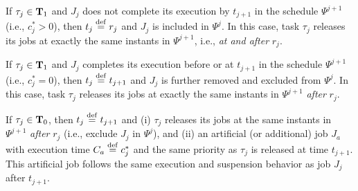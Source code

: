  If $\tau_j \in {\bf T}_1$ and $J_{j}$ does not complete its execution by $t_{j+1}$ in the schedule $\Psi^{j+1}$ (i.e., $c_j^*>0$), then $t_j \stackrel{\mathrm{def}}{=} r_j$ and $J_j$ is included in $\Psi^j$. In this case, task $\tau_j$ releases its jobs at exactly the same instants in $\Psi^{j+1}$, i.e., \emph{at and after} $r_j$.

 If $\tau_j \in {\bf T}_1$ and $J_{j}$ completes its execution before or at $t_{j+1}$ in the schedule $\Psi^{j+1}$ (i.e., $c_j^* = 0$), then $t_j \stackrel{\mathrm{def}}{=} t_{j+1}$ and $J_j$ is further removed and excluded from $\Psi^j$. In this case, task 
 $\tau_j$ releases its jobs at exactly the same instants in $\Psi^{j+1}$ \emph{after} $r_j$.

 If $\tau_j \in {\bf T}_0$, then $t_j \stackrel{\mathrm{def}}{=} t_{j+1}$ and (i) $\tau_j$ releases its jobs at the same instants in $\Psi^{j+1}$ \emph{after} $r_j$ (i.e., exclude $J_j$ in $\Psi^j$), and (ii) an artificial (or additional) job $J_a$ with execution time $C_a \stackrel{\mathrm{def}}{=} c_j^*$ and the same priority as $\tau_j$ is released at time $t_{j+1}$. This artificial job follows the same execution and suspension behavior as job $J_j$ after $t_{j+1}$.

